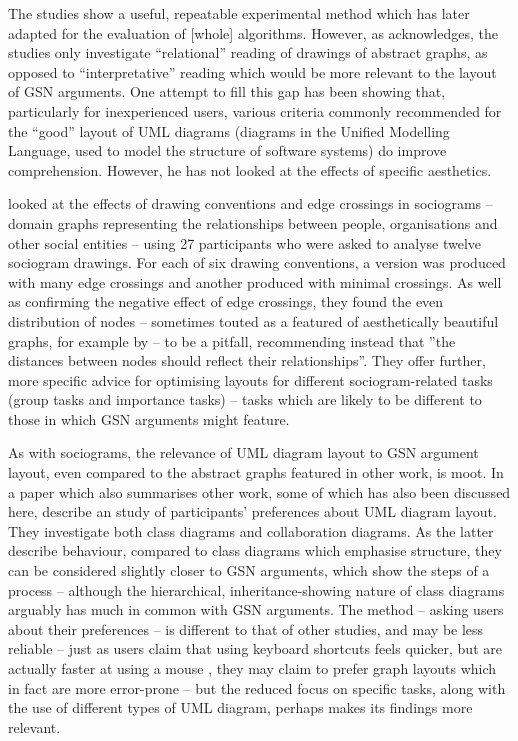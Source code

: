 \begin{itemize*}
The studies show a useful, repeatable experimental method which \citet{PURCHASE1998647} has later adapted for the evaluation of [whole] algorithms.
However, as \citet{Purchase1997which} acknowledges, the studies only investigate ``relational'' reading of drawings of abstract graphs, as opposed to ``interpretative'' reading which would be more relevant to the layout of GSN arguments. One attempt to fill this gap has been \citet{storrle} showing that, particularly for inexperienced users, various criteria commonly recommended for the ``good'' layout of UML diagrams (diagrams in the Unified Modelling Language, used to model the structure of software systems) do improve comprehension. However, he has not looked at the effects of specific aesthetics.

\citet{huang2007effects} looked at the effects of drawing conventions and edge crossings in sociograms -- domain graphs representing the relationships between people, organisations and other social entities -- using 27 participants who were asked to analyse twelve sociogram drawings. For each of six drawing conventions, a version was produced with many edge crossings and another produced with minimal crossings. As well as confirming the negative effect of edge crossings, they found the even distribution of nodes -- sometimes touted as a featured of aesthetically beautiful graphs, for example by \citet{SPE:SPE4380211102} -- to be a pitfall, recommending instead that ''the distances between nodes should reflect their relationships''. They offer further, more specific advice for optimising layouts for different sociogram-related tasks (group tasks and importance tasks) -- tasks which are likely to be different to those in which GSN arguments might feature.

As with sociograms, the relevance of UML diagram layout to GSN argument layout, even compared to the abstract graphs featured in other work, is moot.
In a paper which also summarises other work, some of which has also been discussed here, \citet{Purchase:2002:EEA:594512.594527} describe an study of participants' preferences about UML diagram layout.
They investigate both class diagrams and collaboration diagrams. As the latter describe behaviour, compared to class diagrams which emphasise structure, they can be considered slightly closer to GSN arguments, which show the steps of a process -- although the hierarchical, inheritance-showing nature of class diagrams arguably has much in common with GSN arguments. The method -- asking users about their preferences -- is different to that of other studies, and may be less reliable -- just as users claim that using keyboard shortcuts feels quicker, but are actually faster at using a mouse \citep[pp.~26]{tognazzini1992tog}, they may claim to prefer graph layouts which in fact are more error-prone -- but the reduced focus on specific tasks, along with the use of different types of UML diagram, perhaps makes its findings more relevant. 



\end{itemize*}
